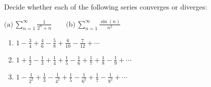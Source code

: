 \documentclass{lew98_solutions}
\begin{document}
\begin{exercise}
\label{ex:2.7.2}
    Decide whether each of the following series converges or diverges:

    \vspace{3mm}
    \hspace{-4.5mm}
    \( \text{(a)} \, \sum_{n=1}^{\infty} \tfrac{1}{2^n + n} \qquad \text{(b)} \, \sum_{n=1}^{\infty} \tfrac{\sin(n)}{n^2} \)
    \begin{enumerate}[start = 3]
        \item \( 1 - \tfrac{3}{4} + \tfrac{4}{6} - \tfrac{5}{8} + \tfrac{6}{10} - \tfrac{7}{12} + \cdots \)

        \item \( 1 + \tfrac{1}{2} - \tfrac{1}{3} + \tfrac{1}{4} + \tfrac{1}{5} - \tfrac{1}{6} + \tfrac{1}{7} + \tfrac{1}{8} - \tfrac{1}{9} + \cdots \)

        \item \( 1 - \tfrac{1}{2^2} + \tfrac{1}{3} - \tfrac{1}{4^2} + \tfrac{1}{5} - \tfrac{1}{6^2} + \tfrac{1}{7} - \tfrac{1}{8^2} + \cdots \)
    \end{enumerate}
\end{exercise}
\end{document}
